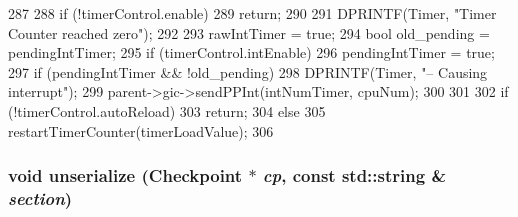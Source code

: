 \begin{DoxyCode}
287 {
288     if (!timerControl.enable)
289         return;
290 
291     DPRINTF(Timer, "Timer Counter reached zero\n");
292 
293     rawIntTimer = true;
294     bool old_pending = pendingIntTimer;
295     if (timerControl.intEnable)
296         pendingIntTimer = true;
297     if (pendingIntTimer && !old_pending) {
298         DPRINTF(Timer, "-- Causing interrupt\n");
299         parent->gic->sendPPInt(intNumTimer, cpuNum);
300     }
301 
302     if (!timerControl.autoReload)
303         return;
304     else
305         restartTimerCounter(timerLoadValue);
306 }
\end{DoxyCode}
\hypertarget{classCpuLocalTimer_1_1Timer_af22e5d6d660b97db37003ac61ac4ee49}{
\subsubsection[{unserialize}]{\setlength{\rightskip}{0pt plus 5cm}void unserialize ({\bf Checkpoint} $\ast$ {\em cp}, \/  const std::string \& {\em section})}}
\label{classCpuLocalTimer_1_1Timer_af22e5d6d660b97db37003ac61ac4ee49}



